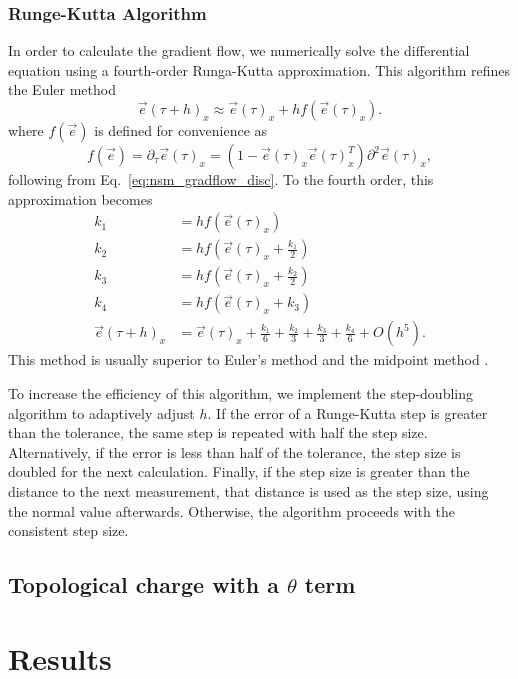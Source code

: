 \documentclass[12pt]{report}
\newcommand{\e}{\vec e}
\begin{document}
\subsection{Runge-Kutta Algorithm}
In order to calculate the gradient flow, we numerically solve the differential equation using a fourth-order Runga-Kutta approximation. This algorithm refines the Euler method 
\begin{equation*}
    \e(\tau+h)_x \approx \e(\tau)_x + h f(\e(\tau)_x).
\end{equation*}
where $f(\e)$ is defined for convenience as 
\begin{equation}
    f(\e)=\partial_\tau \e (\tau)_x  = \left( 1 - \e(\tau)_x \e(\tau)_x^T\right) \partial^2 \e(\tau)_x,
\end{equation}
following from Eq.~\ref{eq:nsm_gradflow_disc}. To the fourth order, this approximation becomes 
%
\begin{align}
    \label{eq:rungekutta}
    k_1 &= h f\left(\e\left(\tau\right)_x\right) \\ 
    k_2 &= h f\left(\e\left(\tau\right)_x + \frac{k_1}{2}\right) \\ 
    k_3 &= h f\left(\e\left(\tau\right)_x + \frac{k_2}{2}\right) \\ 
    k_4 &= h f\left(\e\left(\tau\right)_x + k_3\right) \\ 
    \e(\tau+h)_x &= \e(\tau)_x + \frac{k_1}{6} + \frac{k_2}{3} + \frac{k_3}{3} + \frac{k_4}{6} + O(h^5).
\end{align}
This method is usually superior to Euler's method and the midpoint method \cite{vetterling1992}.

To increase the efficiency of this algorithm, we implement the step-doubling algorithm to adaptively adjust $h$. If the error of a Runge-Kutta step is greater than the tolerance, the same step is repeated with half the step size. Alternatively, if the error is less than half of the tolerance, the step size is doubled for the next calculation. Finally, if the step size is greater than the distance to the next measurement, that distance is used as the step size, using the normal value afterwards. Otherwise, the algorithm proceeds with the consistent step size. 

\section{Topological charge with a $\theta$ term}



\chapter{Results}
\end{document}
